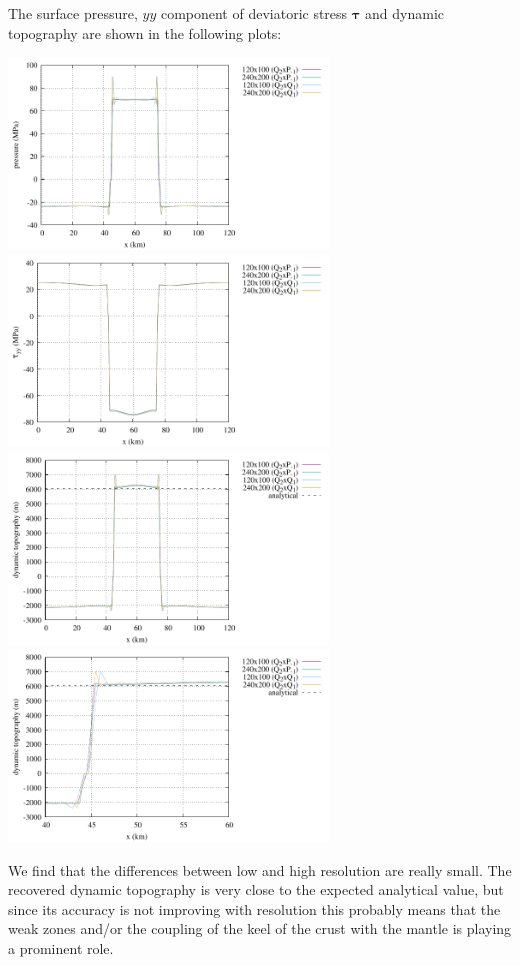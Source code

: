 The surface pressure, $yy$ component of deviatoric stress ${\bm \tau}$ 
and dynamic topography are shown in the following plots:
\begin{center}
\includegraphics[width=8.5cm]{python_codes/fieldstone_160/results/pressure.pdf}
\includegraphics[width=8.5cm]{python_codes/fieldstone_160/results/tau_yy.pdf}\\
\includegraphics[width=8.5cm]{python_codes/fieldstone_160/results/dyn_topo.pdf}
\includegraphics[width=8.5cm]{python_codes/fieldstone_160/results/dyn_topo2.pdf}
\end{center}
We find that the differences between low and high resolution are really small. 
The recovered dynamic topography is very close to the expected analytical value,
but since its accuracy is not improving with resolution this probably means that the 
weak zones and/or the coupling of the keel of the crust with the mantle is 
playing a prominent role.

